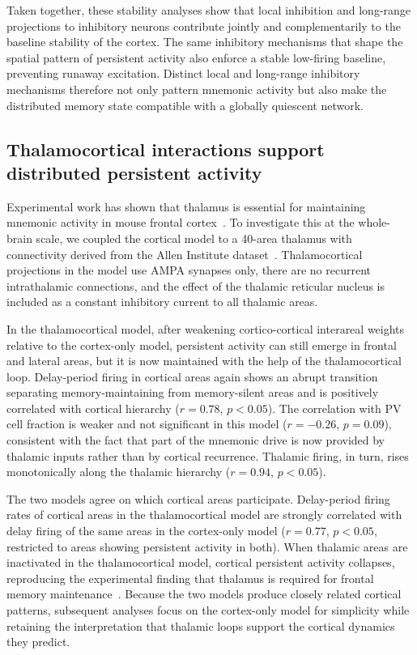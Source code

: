 \documentclass[11pt]{article}
\begin{document}
Taken together, these stability analyses show that local inhibition and long-range projections to inhibitory neurons contribute jointly and complementarily to the baseline stability of the cortex. The same inhibitory mechanisms that shape the spatial pattern of persistent activity also enforce a stable low-firing baseline, preventing runaway excitation. Distinct local and long-range inhibitory mechanisms therefore not only pattern mnemonic activity but also make the distributed memory state compatible with a globally quiescent network.

\subsection{Thalamocortical interactions support distributed persistent activity}

Experimental work has shown that thalamus is essential for maintaining mnemonic activity in mouse frontal cortex~\cite{guo2017maintenance,bolkan2017thalamic,schmitt2017thalamic}. To investigate this at the whole-brain scale, we coupled the cortical model to a 40-area thalamus with connectivity derived from the Allen Institute dataset~\cite{oh2014mesoscale}. Thalamocortical projections in the model use AMPA synapses only, there are no recurrent intrathalamic connections, and the effect of the thalamic reticular nucleus is included as a constant inhibitory current to all thalamic areas.

In the thalamocortical model, after weakening cortico-cortical interareal weights relative to the cortex-only model, persistent activity can still emerge in frontal and lateral areas, but it is now maintained with the help of the thalamocortical loop. Delay-period firing in cortical areas again shows an abrupt transition separating memory-maintaining from memory-silent areas and is positively correlated with cortical hierarchy ($r=0.78$, $p<0.05$). The correlation with PV cell fraction is weaker and not significant in this model ($r=-0.26$, $p=0.09$), consistent with the fact that part of the mnemonic drive is now provided by thalamic inputs rather than by cortical recurrence. Thalamic firing, in turn, rises monotonically along the thalamic hierarchy ($r=0.94$, $p<0.05$).

The two models agree on which cortical areas participate. Delay-period firing rates of cortical areas in the thalamocortical model are strongly correlated with delay firing of the same areas in the cortex-only model ($r=0.77$, $p<0.05$, restricted to areas showing persistent activity in both). When thalamic areas are inactivated in the thalamocortical model, cortical persistent activity collapses, reproducing the experimental finding that thalamus is required for frontal memory maintenance~\cite{guo2017maintenance}. Because the two models produce closely related cortical patterns, subsequent analyses focus on the cortex-only model for simplicity while retaining the interpretation that thalamic loops support the cortical dynamics they predict.
\end{document}
